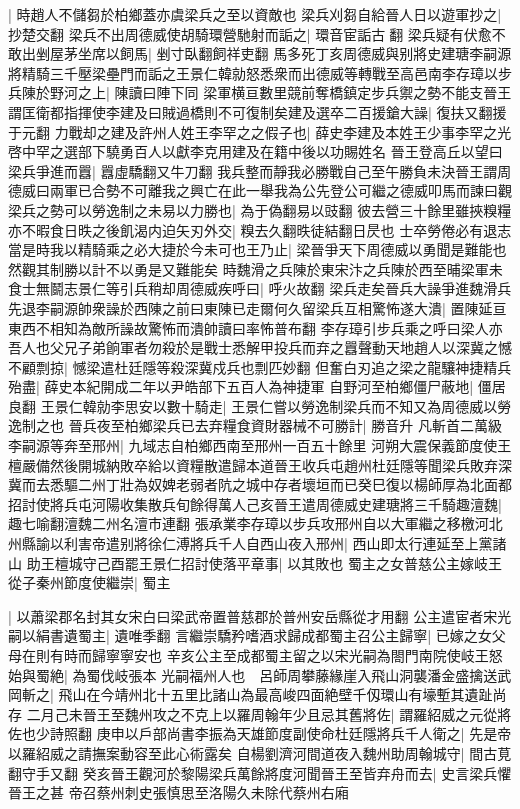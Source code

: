 |{
	時趙人不儲芻於柏鄉蓋亦虞梁兵之至以資敵也}
梁兵刈芻自給晉人日以遊軍抄之|{
	抄楚交翻}
梁兵不出周德威使胡騎環營馳射而詬之|{
	環音宦詬古翻}
梁兵疑有伏愈不敢出剉屋茅坐席以飼馬|{
	剉寸臥翻飼祥吏翻}
馬多死丁亥周德威與别將史建瑭李嗣源將精騎三千壓梁壘門而詬之王景仁韓勍怒悉衆而出德威等轉戰至高邑南李存璋以步兵陳於野河之上|{
	陳讀曰陣下同}
梁軍横亘數里競前奪橋鎮定步兵禦之勢不能支晉王謂匡衛都指揮使李建及曰賊過橋則不可復制矣建及選卒二百援鎗大譟|{
	復扶又翻援于元翻}
力戰却之建及許州人姓王李罕之之假子也|{
	薛史李建及本姓王少事李罕之光啓中罕之選部下驍勇百人以獻李克用建及在籍中後以功賜姓名}
晉王登高丘以望曰梁兵爭進而囂|{
	囂虛驕翻又牛刀翻}
我兵整而靜我必勝戰自己至午勝負未決晉王謂周德威曰兩軍已合勢不可離我之興亡在此一舉我為公先登公可繼之德威叩馬而諫曰觀梁兵之勢可以勞逸制之未易以力勝也|{
	為于偽翻易以豉翻}
彼去營三十餘里雖挾糗糧亦不暇食日昳之後飢渴内迫矢刃外交|{
	糗去久翻昳徒結翻日昃也}
士卒勞倦必有退志當是時我以精騎乘之必大捷於今未可也王乃止|{
	梁晉爭天下周德威以勇聞是難能也然觀其制勝以計不以勇是又難能矣}
時魏滑之兵陳於東宋汴之兵陳於西至晡梁軍未食士無鬬志景仁等引兵稍却周德威疾呼曰|{
	呼火故翻}
梁兵走矣晉兵大譟爭進魏滑兵先退李嗣源帥衆譟於西陳之前曰東陳已走爾何久留梁兵互相驚怖遂大潰|{
	置陳延亘東西不相知為敵所譟故驚怖而潰帥讀曰率怖普布翻}
李存璋引步兵乘之呼曰梁人亦吾人也父兄子弟餉軍者勿殺於是戰士悉解甲投兵而弃之囂聲動天地趙人以深冀之憾不顧剽掠|{
	憾梁遣杜廷隱等殺深冀戍兵也剽匹妙翻}
但奮白刃追之梁之龍驤神捷精兵殆盡|{
	薛史本紀開成二年以尹皓部下五百人為神捷軍}
自野河至柏鄉僵尸蔽地|{
	僵居良翻}
王景仁韓勍李思安以數十騎走|{
	王景仁嘗以勞逸制梁兵而不知又為周德威以勞逸制之也}
晉兵夜至柏鄉梁兵已去弃糧食資財器械不可勝計|{
	勝音升}
凡斬首二萬級李嗣源等奔至邢州|{
	九域志自柏鄉西南至邢州一百五十餘里}
河朔大震保義節度使王檀嚴備然後開城納敗卒給以資糧散遣歸本道晉王收兵屯趙州杜廷隱等聞梁兵敗弃深冀而去悉驅二州丁壯為奴婢老弱者阬之城中存者壞垣而已癸巳復以楊師厚為北面都招討使將兵屯河陽收集散兵旬餘得萬人己亥晉王遣周德威史建瑭將三千騎趣澶魏|{
	趣七喻翻澶魏二州名澶市連翻}
張承業李存璋以步兵攻邢州自以大軍繼之移檄河北州縣諭以利害帝遣别將徐仁溥將兵千人自西山夜入邢州|{
	西山即太行連延至上黨諸山}
助王檀城守己酉罷王景仁招討使落平章事|{
	以其敗也}
蜀主之女普慈公主嫁岐王從子秦州節度使繼崇|{
	蜀主}


|{
	以蕭梁郡名封其女宋白曰梁武帝置普慈郡於普州安岳縣從才用翻}
公主遣宦者宋光嗣以絹書遺蜀主|{
	遺唯季翻}
言繼崇驕矜嗜酒求歸成都蜀主召公主歸寧|{
	已嫁之女父母在則有時而歸寧寧安也}
辛亥公主至成都蜀主留之以宋光嗣為閤門南院使岐王怒始與蜀絶|{
	為蜀伐岐張本}
光嗣福州人也　呂師周攀藤緣崖入飛山洞襲潘金盛擒送武岡斬之|{
	飛山在今靖州北十五里比諸山為最高峻四面絶壁千仭環山有壕塹其遺趾尚存}
二月己未晉王至魏州攻之不克上以羅周翰年少且忌其舊將佐|{
	謂羅紹威之元從將佐也少詩照翻}
庚申以戶部尚書李振為天雄節度副使命杜廷隱將兵千人衛之|{
	先是帝以羅紹威之請撫案動容至此心術露矣}
自楊劉濟河間道夜入魏州助周翰城守|{
	間古莧翻守手又翻}
癸亥晉王觀河於黎陽梁兵萬餘將度河聞晉王至皆弃舟而去|{
	史言梁兵懼晉王之甚}
帝召蔡州刺史張慎思至洛陽久未除代蔡州右廂

